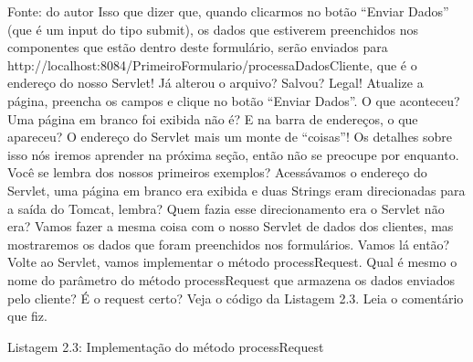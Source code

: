 Fonte: do autor
Isso que dizer que, quando clicarmos no botão ``Enviar Dados'' (que é um input do tipo submit), os dados que estiverem preenchidos nos componentes que estão dentro deste formulário, serão enviados para http://localhost:8084/PrimeiroFormulario/processaDadosCliente, que é o endereço do nosso Servlet! Já alterou o arquivo? Salvou? Legal! Atualize a página, preencha os campos e clique no botão ``Enviar Dados''. O que aconteceu? Uma página em branco foi exibida não é? E na barra de endereços, o que apareceu? O endereço do Servlet mais um monte de ``coisas''! Os detalhes sobre isso nós iremos aprender na próxima seção, então não se preocupe por enquanto.
Você se lembra dos nossos primeiros exemplos? Acessávamos o endereço do Servlet, uma página em branco era exibida e duas Strings eram direcionadas para a saída do Tomcat, lembra? Quem fazia esse direcionamento era o Servlet não era? Vamos fazer a mesma coisa com o nosso Servlet de dados dos clientes, mas mostraremos os dados que foram preenchidos nos formulários. Vamos lá então?
Volte ao Servlet, vamos implementar o método processRequest. Qual é mesmo o nome do parâmetro do método processRequest que armazena os dados enviados pelo cliente? É o request certo? Veja o código da Listagem 2.3. Leia o comentário que fiz.













Listagem 2.3: Implementação do método processRequest
 
